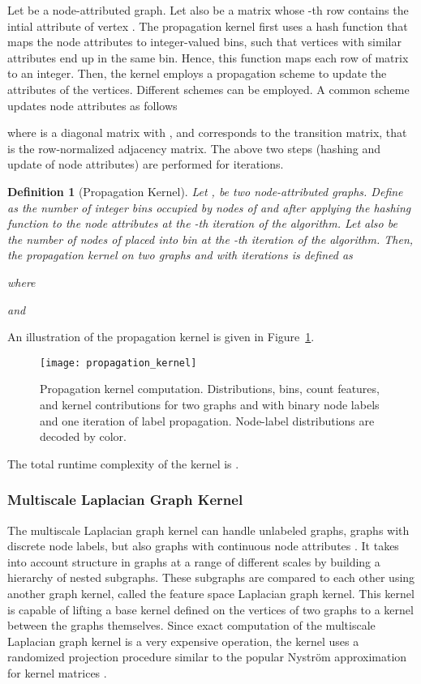 \documentclass[twoside,11pt]{article}
\newtheorem{definition}{Definition}
\begin{document}
Let  be a node-attributed graph.
Let also  be a matrix whose -th row contains the intial attribute of vertex .
The propagation kernel first uses a hash function that maps the node attributes to integer-valued bins, such that vertices with similar attributes end up in the same bin.
Hence, this function maps each row of matrix  to an integer.
Then, the kernel employs a propagation scheme to update the attributes of the vertices.
Different schemes can be employed.
A common scheme updates node attributes as follows

where  is a diagonal matrix with , and  corresponds to the transition matrix, that is the row-normalized adjacency matrix.
The above two steps (hashing and update of node attributes) are performed for  iterations.

\begin{definition}[Propagation Kernel]
  Let ,  be two node-attributed graphs.
  Define  as the number of integer bins occupied by nodes of  and  after applying the hashing function to the node attributes at the -th iteration of the algorithm.
  Let also  be the number of nodes of  placed into bin  at the -th iteration of the algorithm.
  Then, the propagation kernel on two graphs  and  with  iterations is defined as
  
  where
  
  and
  
\end{definition}
An illustration of the propagation kernel is given in Figure~\ref{fig:propagation_kernel}.
\begin{figure}[t]
  \centering
  \texttt{[image: propagation\_kernel]}
  \caption{Propagation kernel computation. Distributions, bins, count features, and kernel contributions for two graphs  and  with binary node labels and one iteration of label propagation. Node-label distributions are decoded by color.}
  \label{fig:propagation_kernel}
\end{figure}
The total runtime complexity of the kernel is .


\subsubsection{Multiscale Laplacian Graph Kernel}
The multiscale Laplacian graph kernel can handle unlabeled graphs, graphs with discrete node labels, but also graphs with continuous node attributes .
It takes into account structure in graphs at a range of different scales by building a hierarchy of nested subgraphs.
These subgraphs are compared to each other using another graph kernel, called the feature space Laplacian graph kernel.
This kernel is capable of lifting a base kernel defined on the vertices of two graphs to a kernel between the graphs themselves.
Since exact computation of the multiscale Laplacian graph kernel is a very expensive operation, the kernel uses a randomized projection procedure  similar to the popular Nystr{\"o}m approximation for kernel matrices .
\end{document}

